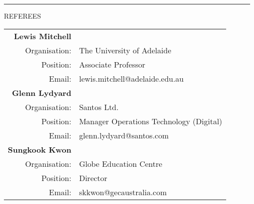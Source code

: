 \documentclass{article}
\newcommand{\HRule}{\rule{\linewidth}{0.5mm}}
\begin{document}
\HRule


{\footnotesize REFEREES}

\begin{center}



\begin{tabular}[H]{ r l}
\textbf{\large Lewis Mitchell} & \\[0.3cm]
Organisation: & The University of Adelaide \\
Position: & Associate Professor \\
Email: & lewis.mitchell@adelaide.edu.au \\[1cm]

\textbf{\large Glenn Lydyard} & \\[0.3cm]
Organisation: & Santos Ltd. \\
Position: & Manager Operations Technology (Digital)\\
Email: & glenn.lydyard@santos.com \\[1cm]

\textbf{\large Sungkook Kwon} & \\[0.3cm]
Organisation: & Globe Education Centre \\
Position: & Director \\
Email: & skkwon@gecaustralia.com \\[1cm]

\end{tabular}

\end{center}
\end{document}
